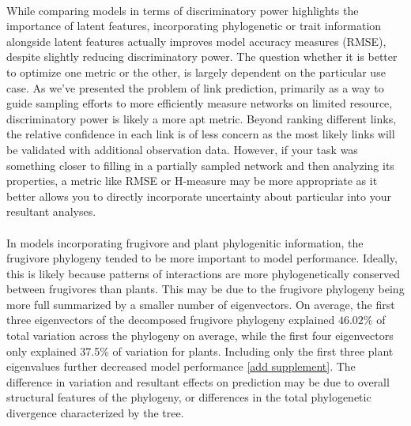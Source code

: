 \documentclass[openacc]{rsproca_new}%
\begin{document}
\paragraph*{} 
While comparing models in terms of discriminatory power highlights the importance of latent features, incorporating phylogenetic or trait information alongside latent features actually improves model accuracy measures (RMSE), despite slightly reducing discriminatory power. The question whether it is better to optimize one metric or the other, is largely dependent on the particular use case. As we've presented the problem of link prediction, primarily as a way to guide sampling efforts to more efficiently measure networks on limited resource, discriminatory power is likely a more apt metric. Beyond ranking different links, the relative confidence in each link is of less concern as the most likely links will be validated with additional observation data. However, if your task was something closer to filling in a partially sampled network and then analyzing its properties, a metric like RMSE or H-measure\cite{hand2009measuring} may be more appropriate as it better allows you to directly incorporate uncertainty about particular into your resultant analyses. 


\paragraph*{} In models incorporating frugivore and plant phylogenitic information, the frugivore phylogeny tended to be more important to model performance. Ideally, this is likely because patterns of interactions are more phylogenetically conserved between frugivores than plants. This may be due to the frugivore phylogeny being more full summarized by a smaller number of eigenvectors. On average, the first three eigenvectors of the decomposed frugivore phylogeny explained $46.02\%$ of total variation across the phylogeny on average, while the first four eigenvectors only explained 37.5\% of variation for plants. Including only the first three plant eigenvalues further decreased model performance \ref{add supplement}. The difference in variation and resultant effects on prediction may be due to overall structural features of the phylogeny, or differences in the total phylogenetic divergence characterized by the tree.
\end{document}
